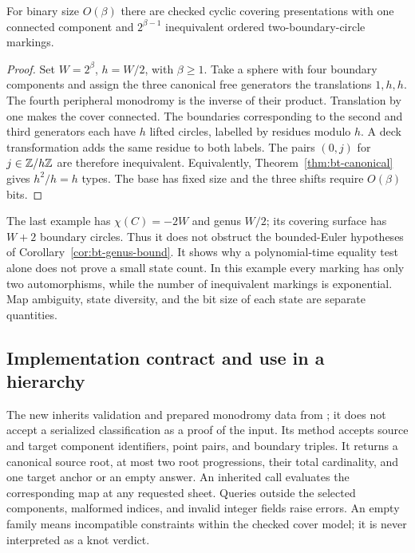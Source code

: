 \begin{proposition}\label{prop:bt-entropy}
For binary size $O(\beta)$ there are checked cyclic covering presentations
with one connected component and $2^{\beta-1}$ inequivalent ordered
two-boundary-circle markings.
\end{proposition}
\begin{proof}
Set $W=2^\beta$, $h=W/2$, with $\beta\ge1$.  Take a sphere with four
boundary components and assign the three canonical free generators
the translations $1,h,h$.  The fourth peripheral monodromy is the
inverse of their product.  Translation by one makes the cover connected.
The boundaries corresponding to the second and third generators each
have $h$ lifted circles, labelled by residues modulo $h$.  A deck
transformation adds the same residue to both labels.  The pairs
$(0,j)$ for $j\in\mathbb Z/h\mathbb Z$ are therefore inequivalent.  Equivalently,
Theorem~\ref{thm:bt-canonical} gives $h^2/h=h$ types.
The base has fixed size and the three shifts require $O(\beta)$ bits.
\end{proof}

The last example has $\chi(C)=-2W$ and genus $W/2$; its covering surface
has $W+2$ boundary circles.  Thus it does not obstruct the bounded-Euler
hypotheses of Corollary~\ref{cor:bt-genus-bound}.  It shows why a
polynomial-time equality test alone does not prove a small state count.
In this example every marking has only two automorphisms, while the
number of inequivalent markings is exponential.  Map ambiguity, state
diversity, and the bit size of each state are separate quantities.

\subsection{Implementation contract and use in a hierarchy}

The new  inherits validation and prepared
monodromy data from ; it does not accept a serialized
classification as a proof of the input. Its  method
accepts source and target component identifiers, point pairs, and
boundary triples. It returns a canonical source root,
at most two root progressions, their total cardinality, and one target
anchor or an empty answer.  An inherited  call
evaluates the corresponding map at any requested sheet.  Queries outside
the selected components, malformed indices, and invalid integer fields
raise errors.  An empty family means incompatible constraints within
the checked cover model; it is never interpreted as a knot verdict.

